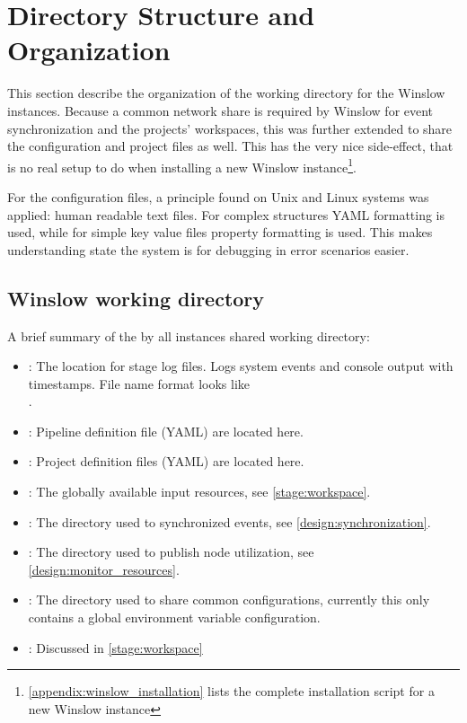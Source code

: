 \section{Directory Structure and Organization}

This section describe the organization of the working directory for the Winslow instances.
Because a common network share is required by Winslow for event synchronization and the projects' workspaces, this was further extended to share the configuration and project files as well.
This has the very nice side-effect, that is no real setup to do when installing a new Winslow instance\footnote{\autoref{appendix:winslow_installation} lists the complete installation script for a new Winslow instance}.

For the configuration files, a principle found on Unix and Linux systems was applied: human readable text files.
For complex structures YAML formatting is used, while for simple key value files property formatting is used.
This makes understanding state the system is for debugging in error scenarios easier.

\subsection{Winslow working directory}

A brief summary of the by all instances shared working directory:

\begin{itemize}
	\item {}: The location for stage log files. Logs system events and console output with timestamps. File name format looks like \\
	.
	\item {}: Pipeline definition file (YAML) are located here.
	\item {}: Project definition files (YAML) are located here.
	\item {}: The globally available input resources, see \autoref{stage:workspace}.
	\item {}: The directory used to synchronized events, see \autoref{design:synchronization}.
	\item {}: The directory used to publish node utilization, see \autoref{design:monitor_resources}.
	\item {}: The directory used to share common configurations, currently this only contains a global environment variable configuration.
	\item {}: Discussed in \autoref{stage:workspace}
\end{itemize}

